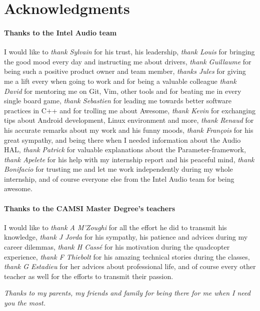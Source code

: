 \chapter*{Acknowledgments}

\subsubsection*{Thanks to the Intel Audio team}
I would like to
\emph{thank Sylvain} for his trust, his leadership,
\emph{thank Louis} for bringing the good mood every day and instructing me about drivers,
\emph{thank Guillaume} for being such a positive product owner and team member,
\emph{thanks Jules} for giving me a lift every when going to work and for being a valuable colleague
\emph{thank David} for mentoring me on Git, Vim, other tools and for beating me in every single board game,
\emph{thank Sebastien} for leading me towards better software practices in C++ and for trolling me about Awesome,
\emph{thank Kevin} for exchanging tips about Android development, Linux environment and more,
\emph{thank Renaud} for his accurate remarks about my work and his funny moods,
\emph{thank François} for his great sympathy, and being there when I needed information about the Audio HAL,
\emph{thank Patrick} for valuable explanations about the Parameter-framework,
\emph{thank Apelete} for his help with my internship report and his peaceful mind,
\emph{thank Bonifacio} for trusting me and let me work independently during my whole internship,
and of course everyone else from the Intel Audio team for being awesome.

\subsubsection*{Thanks to the CAMSI Master Degree's teachers}
I would like to
\emph{thank A M'Zoughi} for all the effort he did to transmit his knowledge,
\emph{thank J Jorda} for his sympathy, his patience and advices during my career dilemmas,
\emph{thank H Cassé} for his motivation during the quadcopter experience,
\emph{thank F Thiebolt} for his amazing technical stories during the classes,
\emph{thank G Estadieu} for her advices about professional life,
and of course every other teacher as well for the efforts to transmit their passion.

\vfill

\begin{minipage}{0.49\textwidth}
\begin{flushright}
\end{flushright}
\end{minipage}
\begin{minipage}{0.49\textwidth}
\begin{flushleft}
  \emph{Thanks to my parents, my friends and family for being there for me when I need you the most.}
\end{flushleft}
\end{minipage}
